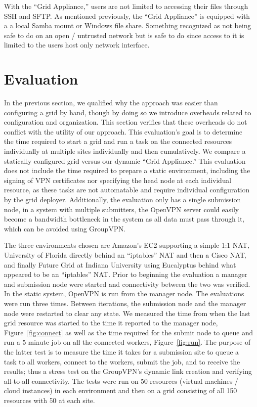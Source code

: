 \documentclass[conference]{IEEEtran}
\begin{document}
With the ``Grid Appliance,'' users are not limited to accessing their files
through SSH and SFTP.  As mentioned previously, the ``Grid Appliance'' is
equipped with a a local Samba mount or Windows file share.  Something
recognized as not being safe to do on an open / untrusted network but is safe
to do since access to it is limited to the users host only network interface.

\section{Evaluation}
\label{evaluation}

In the previous section, we qualified why the approach was easier than
configuring a grid by hand, though by doing so we introduce overheads related
to configuration and organization.  This section verifies that these overheads
do not conflict with the utility of our approach.  This evaluation's goal is to
determine the time required to start a grid and run a task on the connected
resources individually at multiple sites individually and then cumulatively.
We compare a statically configured grid versus our dynamic ``Grid Appliance.''
This evaluation does not include the time required to prepare a static
environment, including the signing of VPN certificates nor specifying the head
node at each individual resource, as these tasks are not automatable and
require individual configuration by the grid deployer.  Additionally, the
evaluation only has a single submission node, in a system with multiple
submitters, the OpenVPN server could easily become a bandwidth bottleneck in
the system as all data must pass through it, which can be avoided using
GroupVPN.

The three environments chosen are Amazon's EC2 supporting a simple 1:1 NAT,
University of Florida directly behind an ``iptables'' NAT and then a Cisco NAT,
and finally Future Grid at Indiana University using Eucalyptus behind what
appeared to be an ``iptables'' NAT.  Prior to beginning the evaluation a
manager and submission node were started and connectivity between the two was
verified.  In the static system, OpenVPN is run from the manager node.  The
evaluations were run three times.  Between iterations, the submission node and
the manager node were restarted to clear any state.  We measured the time from
when the last grid resource was started to the time it reported to the manager
node, Figure~\ref{fig:connect} as well as the time required for the submit node
to queue and run a 5 minute job on all the connected workers,
Figure~\ref{fig:run}.  The purpose of the latter test is to measure the time it
takes for a submission site to queue a task to all workers, connect to the
workers, submit the job, and to receive the results; thus a stress test on the
GroupVPN's dynamic link creation and verifying all-to-all connectivity.  The
tests were run on 50 resources (virtual machines / cloud instances) in each
environment and then on a grid consisting of all 150 resources with 50 at each
site.
\end{document}
